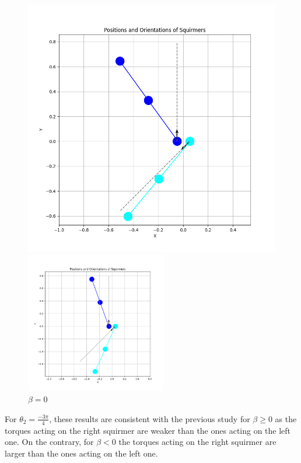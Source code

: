 \documentclass{article}
\begin{document}
\begin{figure}[H]
\begin{minipage}{0.49\textwidth}
        \includegraphics[width=1.1\textwidth]{graphs/simulations/sim_sq_sq/beta3/m3pi_4_.png}
        \caption{\footnotesize $\beta = 3$}
    \end{minipage}
    \includegraphics[width=0.55\textwidth]{graphs/simulations/sim_sq_sq/beta0/m3pi_4_.png}
    \caption{\footnotesize $\beta = 0$}
\end{figure}
For $\theta_2 = \frac{-3\pi}{4}$, these results are consistent with the previous study\cite{Stark} for $\beta \ge 0$ as the torques acting on the right squirmer
are weaker than the ones acting on the left one. On the contrary, for $\beta < 0$ the torques acting on the right squirmer are larger
than the ones acting on the left one.
\end{document}
